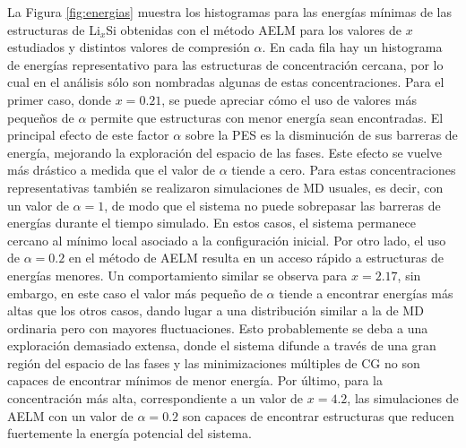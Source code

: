 La Figura \ref{fig:energias} muestra los histogramas para las energías mínimas
de las estructuras de Li$_x$Si obtenidas con el método AELM para los valores de
$x$ estudiados y distintos valores de compresión $\alpha$. En cada fila hay un 
histograma de energías representativo para las estructuras de concentración 
cercana, por lo cual en el análisis sólo son nombradas algunas de estas 
concentraciones. Para el primer caso, donde $x = 0.21$, se puede apreciar cómo el 
uso de valores más pequeños de $\alpha$ permite que estructuras con menor energía 
sean encontradas. El principal efecto de este factor $\alpha$ sobre la PES es la 
disminución de sus barreras de energía, mejorando la exploración del espacio de 
las fases. Este efecto se vuelve más drástico a medida que el valor de $\alpha$ 
tiende a cero. Para estas concentraciones representativas también se realizaron 
simulaciones de MD usuales, es decir, con un valor de $\alpha = 1$, de modo que el sistema no 
puede sobrepasar las barreras de energías durante el tiempo simulado. En estos casos, el sistema 
permanece cercano al mínimo local asociado a la configuración inicial. Por otro 
lado, el uso de $\alpha = 0.2$ en el método de AELM resulta en un acceso rápido
a estructuras de energías menores. Un comportamiento similar se observa para 
$x = 2.17$, sin embargo, en este caso el valor más pequeño de $\alpha$ tiende a 
encontrar energías más altas que los otros casos, dando lugar a una distribución
similar a la de MD ordinaria pero con mayores fluctuaciones. Esto probablemente 
se deba a una exploración demasiado extensa, donde el sistema difunde a través
de una gran región del espacio de las fases y las minimizaciones múltiples de 
CG no son capaces de encontrar mínimos de menor energía. Por último, para la 
concentración más alta, correspondiente a un valor de $x = 4.2$, las simulaciones 
de AELM con un valor de $\alpha = 0.2$ son capaces de encontrar estructuras que 
reducen fuertemente la energía potencial del sistema. 
